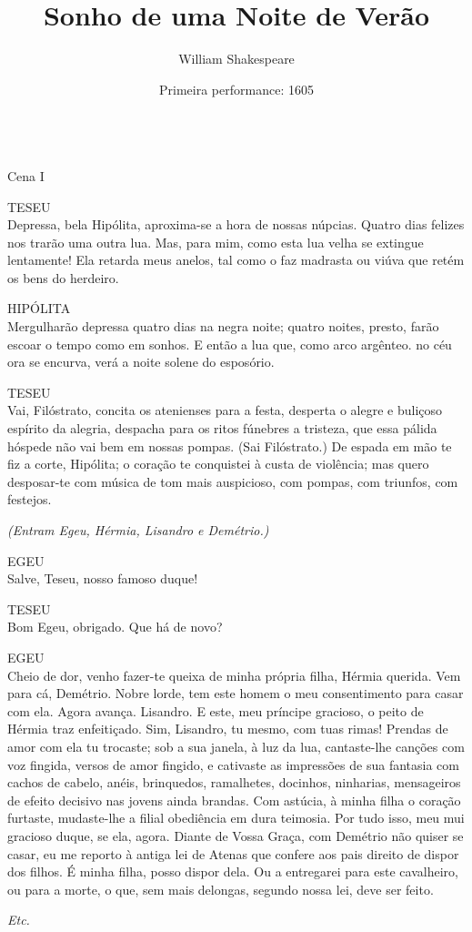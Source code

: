 \documentclass[a4paper, twoside]{book}
\title{Sonho de uma Noite de Verão}
\author{William Shakespeare}
\date{Primeira performance: 1605}
\begin{document}
\frenchspacing

\maketitle

\\
{\Large Cena I}


\textsc{TESEU}\\
Depressa, bela Hipólita, aproxima-se a hora de nossas núpcias. Quatro
dias felizes nos trarão uma outra lua. Mas, para mim, como esta lua velha se
extingue lentamente! Ela retarda meus anelos, tal como o faz madrasta ou viúva
que retém os bens do herdeiro.

\textsc{HIPÓLITA}\\
Mergulharão depressa quatro dias na negra noite; quatro noites,
presto, farão escoar o tempo como em sonhos. E então a lua que, como arco
argênteo. no céu ora se encurva, verá a noite solene do esposório.

\textsc{TESEU}\\
Vai, Filóstrato, concita os atenienses para a festa, desperta o alegre
e buliçoso espírito da alegria, despacha para os ritos fúnebres a tristeza, que
essa pálida hóspede não vai bem em nossas pompas. (Sai Filóstrato.) De espada
em mão te fiz a corte, Hipólita; o coração te conquistei à custa de violência;
mas quero desposar-te com música de tom mais auspicioso, com pompas, com
triunfos, com festejos.

\emph{(Entram Egeu, Hérmia, Lisandro e Demétrio.)}

\textsc{EGEU}\\
Salve, Teseu, nosso famoso duque!

\textsc{TESEU}\\
Bom Egeu, obrigado. Que há de novo?

\textsc{EGEU}\\
Cheio de dor, venho fazer-te queixa de minha própria filha, Hérmia
querida. Vem para cá, Demétrio. Nobre lorde, tem este homem o meu consentimento
para casar com ela. Agora avança. Lisandro. E este, meu príncipe gracioso, o
peito de Hérmia traz enfeitiçado. Sim, Lisandro, tu mesmo, com tuas rimas!
Prendas de amor com ela tu trocaste; sob a sua janela, à luz da lua,
cantaste-lhe canções com voz fingida, versos de amor fingido, e cativaste as
impressões de sua fantasia com cachos de cabelo, anéis, brinquedos, ramalhetes,
docinhos, ninharias, mensageiros de efeito decisivo nas jovens ainda brandas.
Com astúcia, à minha filha o coração furtaste, mudaste-lhe a filial obediência
em dura teimosia. Por tudo isso, meu mui gracioso duque, se ela, agora. Diante
de Vossa Graça, com Demétrio não quiser se casar, eu me reporto à antiga lei de
Atenas que confere aos pais direito de dispor dos filhos. É minha filha, posso
dispor dela. Ou a entregarei para este cavalheiro, ou para a morte, o que, sem
mais delongas, segundo nossa lei, deve ser feito.

\emph{Etc.}
\end{document}
